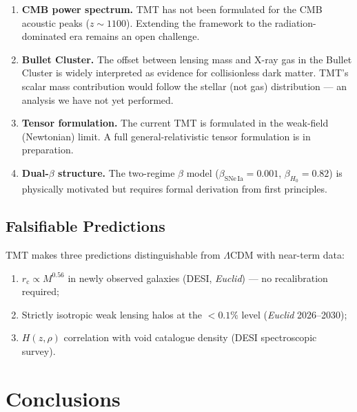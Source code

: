 \documentclass[manuscript,linenumbers]{aastex631}
\newcommand{\rc}{r_{\mathrm{c}}}
\newcommand{\HObs}{H_{\mathrm{0}}}
\begin{document}
\begin{enumerate}
  \item \textbf{CMB power spectrum.}  TMT has not been formulated for
    the CMB acoustic peaks ($z \sim 1100$).  Extending the framework
    to the radiation-dominated era remains an open challenge.

  \item \textbf{Bullet Cluster.}  The offset between lensing mass and
    X-ray gas in the Bullet Cluster \citep{Clowe2006} is widely
    interpreted as evidence for collisionless dark matter.  TMT's
    scalar mass contribution would follow the stellar (not gas)
    distribution --- an analysis we have not yet performed.

  \item \textbf{Tensor formulation.}  The current TMT is formulated
    in the weak-field (Newtonian) limit.  A full general-relativistic
    tensor formulation is in preparation.

  \item \textbf{Dual-$\beta$ structure.}  The two-regime $\beta$ model
    ($\beta_{\mathrm{SNe\,Ia}} = 0.001$, $\beta_{\HObs} = 0.82$) is
    physically motivated but requires formal derivation from first
    principles.
\end{enumerate}

\subsection{Falsifiable Predictions}
\label{sec:predictions}

TMT makes three predictions distinguishable from $\Lambda$CDM with
near-term data:

\begin{enumerate}
  \item $\rc \propto M^{0.56}$ in newly observed galaxies (DESI,
    \textit{Euclid}) --- no recalibration required;
  \item Strictly isotropic weak lensing halos at the $<0.1\%$ level
    (\textit{Euclid} 2026--2030);
  \item $H(z,\rho)$ correlation with void catalogue density (DESI
    spectroscopic survey).
\end{enumerate}

\section{Conclusions}
\label{sec:conclusions}
\end{document}
